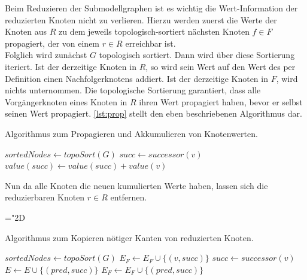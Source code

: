 Beim Reduzieren der Submodellgraphen ist es wichtig die Wert-Information der reduzierten Knoten nicht zu verlieren. Hierzu werden zuerst die Werte der Knoten aus $R$ zu dem jeweils topologisch-sortiert nächsten Knoten $f \in F$ propagiert, der von einem $r \in R$ erreichbar ist. \\
Folglich wird zunächst $G$ topologisch sortiert. Dann wird über diese Sortierung iteriert. Ist der derzeitige Knoten in $R$, so wird sein Wert auf den Wert des per Definition einen Nachfolgerknotens addiert. Ist der derzeitige Knoten in $F$, wird nichts unternommen. Die topologische Sortierung garantiert, dass alle Vorgängerknoten eines Knoten in $R$ ihren Wert propagiert haben, bevor er selbst seinen Wert propagiert. \autoref{lst:prop} stellt den eben beschriebenen Algorithmus dar.

\begin{algorithm}
	\caption{Algorithmus zum Propagieren und Akkumulieren von Knotenwerten.}\label{lst:prop}
	\begin{algorithmic}[1]
		 
			\State $sortedNodes \gets topoSort(G)$
					\State $succ \gets successor(v)$ 
					\State $value(succ) \gets value(succ) + value(v)$
				\EndIf
			\EndFor
		\EndProcedure
	\end{algorithmic}
\end{algorithm}

Nun da alle Knoten die neuen kumulierten Werte haben, lassen sich die reduzierbaren Knoten $r \in R$ entfernen. 

\mathchardef\mhyphen="2D

\begin{algorithm}
	\caption{Algorithmus zum Kopieren nötiger Kanten von reduzierten Knoten.}\label{lst:reduce}
	\begin{algorithmic}[1]
		 
			\State $sortedNodes \gets topoSort(G)$
							\State $E_F \gets E_F \cup \{(v, succ)\}$ 
						\EndIf
					\EndFor
				\Else {}
					\State $succ \gets successor(v)$ 
							\State $E \gets E \cup \{(pred, succ)\}$
							\State $E_F \gets E_F \cup \{(pred, succ)\}$ 
						\EndIf
					\EndFor
				\EndIf
			\EndFor\label{euclidendwhile}
		\EndProcedure
	\end{algorithmic}
\end{algorithm}

